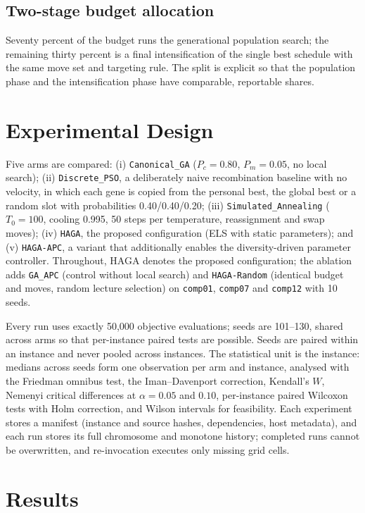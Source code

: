 \documentclass[journal]{IEEEtran}
\newcommand{\code}[1]{\texttt{#1}}
\begin{document}
\subsection{Two-stage budget allocation}
Seventy percent of the budget runs the generational population search; the remaining thirty percent is a final intensification of the single best schedule with the same move set and targeting rule. The split is explicit so that the population phase and the intensification phase have comparable, reportable shares.

\section{Experimental Design}
Five arms are compared: (i) \code{Canonical\_GA} ($P_c=0.80$, $P_m=0.05$, no local search); (ii) \code{Discrete\_PSO}, a deliberately naive recombination baseline with no velocity, in which each gene is copied from the personal best, the global best or a random slot with probabilities 0.40/0.40/0.20; (iii) \code{Simulated\_Annealing} ($T_0=100$, cooling 0.995, 50 steps per temperature, reassignment and swap moves); (iv) \code{HAGA}, the proposed configuration (ELS with static parameters); and (v) \code{HAGA-APC}, a variant that additionally enables the diversity-driven parameter controller. Throughout, HAGA denotes the proposed configuration; the ablation adds \code{GA\_APC} (control without local search) and \code{HAGA-Random} (identical budget and moves, random lecture selection) on \code{comp01}, \code{comp07} and \code{comp12} with 10 seeds.

Every run uses exactly 50{,}000 objective evaluations; seeds are 101--130, shared across arms so that per-instance paired tests are possible. Seeds are paired within an instance and never pooled across instances. The statistical unit is the instance: medians across seeds form one observation per arm and instance, analysed with the Friedman omnibus test, the Iman--Davenport correction, Kendall's $W$, Nemenyi critical differences at $\alpha=0.05$ and $0.10$, per-instance paired Wilcoxon tests with Holm correction, and Wilson intervals for feasibility. Each experiment stores a manifest (instance and source hashes, dependencies, host metadata), and each run stores its full chromosome and monotone history; completed runs cannot be overwritten, and re-invocation executes only missing grid cells.

\section{Results}
\end{document}
